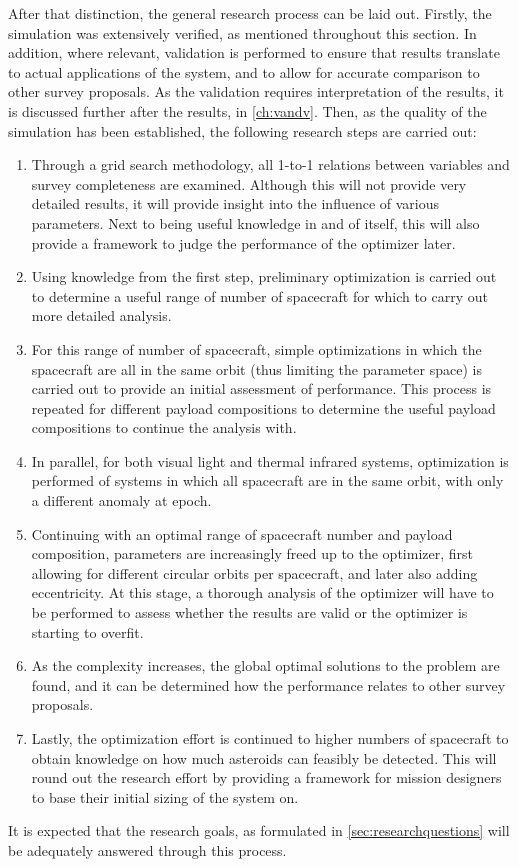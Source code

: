 After that distinction, the general research process can be laid out. Firstly, the simulation was extensively verified, as mentioned throughout this section. In addition, where relevant, validation is performed to ensure that results translate to actual applications of the system, and to allow for accurate comparison to other survey proposals. As the validation requires interpretation of the results, it is discussed further after the results, in \autoref{ch:vandv}. Then, as the quality of the simulation has been established, the following research steps are carried out:
\begin{enumerate}
 \item Through a grid search methodology, all 1-to-1 relations between variables and survey completeness are examined. Although this will not provide very detailed results, it will provide insight into the influence of various parameters. Next to being useful knowledge in and of itself, this will also provide a framework to judge the performance of the optimizer later.
 \item Using knowledge from the first step, preliminary optimization is carried out to determine a useful range of number of spacecraft for which to carry out more detailed analysis.
 \item For this range of number of spacecraft, simple optimizations in which the spacecraft are all in the same orbit (thus limiting the parameter space) is carried out to provide an initial assessment of performance. This process is repeated for different payload compositions to determine the useful payload compositions to continue the analysis with.
 \item In parallel, for both visual light and thermal infrared systems, optimization is performed of systems in which all spacecraft are in the same orbit, with only a different anomaly at epoch.
 \item Continuing with an optimal range of spacecraft number and payload composition, parameters are increasingly freed up to the optimizer, first allowing for different circular orbits per spacecraft, and later also adding eccentricity. At this stage, a thorough analysis of the optimizer will have to be performed to assess whether the results are valid or the optimizer is starting to overfit.
 \item As the complexity increases, the global optimal solutions to the problem are found, and it can be determined how the performance relates to other survey proposals.
 \item Lastly, the optimization effort is continued to higher numbers of spacecraft to obtain knowledge on how much asteroids can feasibly be detected. This will round out the research effort by providing a framework for mission designers to base their initial sizing of the system on.
\end{enumerate}
It is expected that the research goals, as formulated in \autoref{sec:researchquestions} will be adequately answered through this process.
